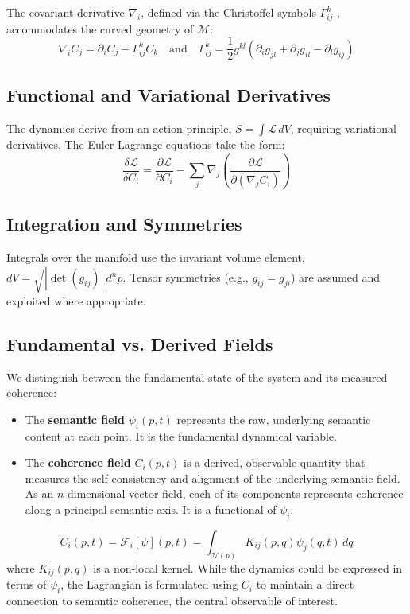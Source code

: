 The covariant derivative \(\nabla_i\), defined via the Christoffel symbols \(\Gamma^k_{ij}\) \autocite{Christoffel1869}, accommodates the curved geometry of \(\mathcal{M}\):
\begin{equation}
\nabla_i C_j = \partial_i C_j - \Gamma^k_{ij} C_k \quad \text{and} \quad \Gamma^k_{ij} = \frac{1}{2} g^{kl} ( \partial_i g_{jl} + \partial_j g_{il} - \partial_l g_{ij} )
\end{equation}

\subsection{Functional and Variational Derivatives}

The dynamics derive from an action principle, \(S = \int \mathcal{L} \, dV\), requiring variational derivatives. The Euler-Lagrange equations take the form:
\begin{equation}
\frac{\delta \mathcal{L}}{\delta C_i} = \frac{\partial \mathcal{L}}{\partial C_i} - \sum_j \nabla_j \left( \frac{\partial \mathcal{L}}{\partial (\nabla_j C_i)} \right)
\end{equation}

\subsection{Integration and Symmetries}

Integrals over the manifold use the invariant volume element, \(dV = \sqrt{|\det(g_{ij})|} \, d^n p\). Tensor symmetries (e.g., \(g_{ij} = g_{ji}\)) are assumed and exploited where appropriate.

\subsection{Fundamental vs. Derived Fields}

We distinguish between the fundamental state of the system and its measured coherence:
\begin{itemize}
    \item The \textbf{semantic field} \(\psi_i(p,t)\) represents the raw, underlying semantic content at each point. It is the fundamental dynamical variable.
    \item The \textbf{coherence field} \(C_i(p,t)\) is a derived, observable quantity that measures the self-consistency and alignment of the underlying semantic field. As an \(n\)-dimensional vector field, each of its components represents coherence along a principal semantic axis. It is a functional of \(\psi_i\):
\end{itemize}
\begin{equation}
C_i(p,t) = \mathcal{F}_i[\psi](p,t) = \int_{\mathcal{N}(p)} K_{ij}(p,q) \psi_j(q,t) \, dq
\end{equation}
where \(K_{ij}(p,q)\) is a non-local kernel. While the dynamics could be expressed in terms of \(\psi_i\), the Lagrangian is formulated using \(C_i\) to maintain a direct connection to semantic coherence, the central observable of interest.

